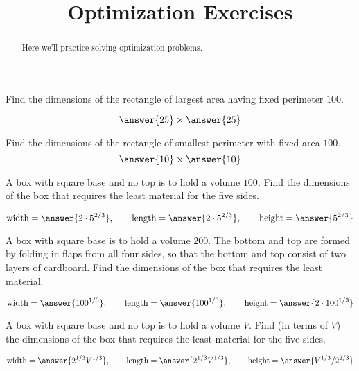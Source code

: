 \documentclass[handout]{ximera}
\title[Exercises:]{Optimization Exercises}
\begin{document}
\begin{abstract}
  Here we'll practice solving optimization problems.
\end{abstract}
\maketitle

\begin{exercise}
  Find the dimensions of the rectangle of largest area having fixed
  perimeter $100$.

  \[
  \answer{25}\times \answer{25}
  \]

\end{exercise}

\begin{exercise}
 Find the dimensions of the rectangle of smallest perimeter with fixed area $100$.
  \[
  \answer{10}\times \answer{10}
  \]

\end{exercise}

\begin{exercise}
A box with square base and no top is to hold a volume $100$.  Find
  the dimensions of the box that requires the least material for the
  five sides.

  \[
  \text{width}=\answer{2\cdot 5^{2/3}},\qquad
  \text{length}=\answer{2\cdot 5^{2/3}},\qquad
  \text{height}=\answer{5^{2/3}}
  \]

\end{exercise}

\begin{exercise}
A box with square base is to hold a volume $200$. The bottom and top
  are formed by folding in flaps from all four sides, so that the
  bottom and top consist of two layers of cardboard.  Find the
  dimensions of the box that requires the least material.

  \[
  \text{width}=\answer{100^{1/3}},\qquad
  \text{length}=\answer{100^{1/3}},\qquad
  \text{height}=\answer{2\cdot 100^{1/3}}
  \]

\end{exercise}

\begin{exercise}
A box with square base and no top is to hold a volume $V$.  Find (in
  terms of $V$) the dimensions of the box that requires the least
  material for the five sides.

  \[
  \text{width}=\answer{2^{1/3}V^{1/3}},\qquad
  \text{length}=\answer{2^{1/3}V^{1/3}},\qquad
  \text{height}=\answer{V^{1/3}/2^{2/3}}
  \]

\end{exercise}
\end{document}
